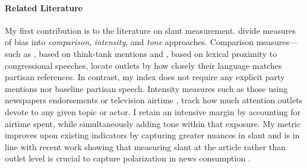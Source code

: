 \documentclass[12pt]{article}
\begin{document}

\paragraph{Related Literature}


My first contribution is to the literature on slant measurement. \citet{puglisi_review} divide measures of bias into  \textit{comparison},  \textit{intensity}, and  \textit{tone} approaches. Comparison measures—such as \citet{milyo_measure}, based on think-tank mentions and \citet{gentzkow2010media}, based on lexical proximity to congressional speeches, locate outlets by how closely their language matches partisan references. In contrast, my index  does not require any explicit party mentions nor baseline partisan speech. Intensity measures such as those using newspapers endorsements \citep{ChiangKnight2011} or television airtime \citep{durante2012partisan,CageHengelHerveUrvoy2022}, track how much attention outlets devote to any given topic or actor. I retain an intensive margin by accounting for airtime spent, while simultaneously adding tone within that exposure. My metric improves upon existing indicators by capturing greater nuances in slant and is in line with recent work showing that measuring slant at the article rather than outlet level is crucial to capture polarization in news consumption \citep{BraghieriLLMS}.
\end{document}
